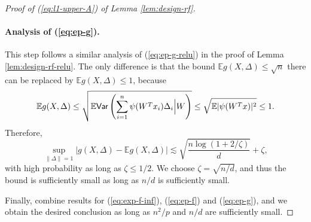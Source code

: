 \begin{proof}[Proof of (\ref{eq:l1-upper-A}) of Lemma \ref{lem:design-rf}]
\paragraph{Analysis of (\ref{eq:ep-g}).} This step follows a similar analysis of (\ref{eq:ep-g-relu}) in the proof of Lemma \ref{lem:design-rf-relu}. The only difference is that the bound $\mathbb{E}g(X,\Delta)\leq \sqrt{n}$ there can be replaced by $\mathbb{E}g(X,\Delta)\leq 1$, because
$$\mathbb{E}g(X,\Delta)\leq \sqrt{\mathbb{E}\textsf{Var}\left(\sum_{i=1}^n\psi(W^Tx_i)\Delta_i\Big|W\right)}\leq \sqrt{\mathbb{E}|\psi(W^Tx)|^2}\leq 1.$$
Therefore,
$$\sup_{\|\Delta\|=1}|g(X,\Delta) - \mathbb{E}g(X,\Delta)|\lesssim \sqrt{\frac{n\log(1+2/\zeta)}{d}} + \zeta,$$
with high probability as long as $\zeta\leq 1/2$. We choose $\zeta=\sqrt{n/d}$, and thus the bound is sufficiently small as long as $n/d$ is sufficiently small.

Finally, combine results for (\ref{eq:exp-f-inf}), (\ref{eq:ep-f}) and (\ref{eq:ep-g}), and we obtain the desired conclusion as long as $n^2/p$ and $n/d$ are sufficiently small.
\end{proof}

